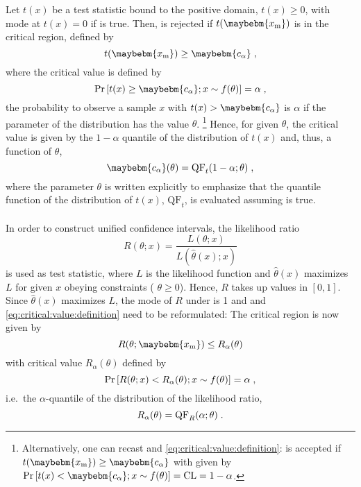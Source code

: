 \documentclass[a4paper]{article}
\newcommand*\Hnull{\maybebm{\mathrm{H}_0}\xspace}
\newcommand*\Prob{\mathrm{Pr}}
\newcommand*\xm{\maybebm{x_{\mathrm{m}}}\xspace}
\newcommand*\ta{\maybebm{c_\alpha}\xspace}
\newcommand*\QF{\mathrm{QF}}
\begin{document}
Let $t(x)$ be a test statistic bound to the positive domain, $t(x) \geq
0$, with mode at $t(x) = 0$ if \Hnull is true. Then, \Hnull is rejected
if $t(\xm)$ is in the critical region, defined by
%
\begin{equation}
  \label{eq:hnull:rejection}
  t(\xm) \geq \ta
  \fcomma
\end{equation}
%
where the critical value \ta is defined by
%
\begin{equation}
  \label{eq:critical:value:definition}
  \Prob\left[ t(x) \geq \ta; x \sim f(\theta)\right] = \alpha
  \fcomma
\end{equation}
%
\ie the probability to observe a sample $x$ with $t(x) > \ta$ is
$\alpha$ if the parameter of the distribution has the value $\theta$.%
\footnote{%
  Alternatively, one can recast  and
  \eqref{eq:critical:value:definition}: \Hnull is accepted if
  $t(\xm) \geq \ta$
  with \ta given by
  $\Pr\left[ t(x) < \ta; x \sim f(\theta) \right] = \CL = 1 - \alpha$.
}%
Hence, for given $\theta$, the critical value \ta is given by the
$1-\alpha$ quantile of the distribution of $t(x)$ and, thus, a function of
$\theta$,
%
\begin{equation*}
  \ta(\theta) = \QF_t(1-\alpha; \theta)
  \fcomma
\end{equation*}
%
where the parameter $\theta$ is written explicitly to emphasize that the
quantile function of the distribution of $t(x)$, $\QF_t$, is evaluated assuming \Hnull is true.

\paragraph{}
In order to construct unified confidence intervals, the likelihood ratio
%
\begin{equation*}
  R(\theta; x) = \frac{L(\theta; x)}{L(\hat{\theta}(x); x)}
\end{equation*}
is used as test statistic\cite{Feldman1998}, where $L$ is the likelihood function and
$\hat{\theta}(x)$ maximizes $L$ for given $x$ obeying constraints (\eg
$\theta \geq 0$).
Hence, $R$ takes up values in
$[0,1]$. Since $\hat{\theta}(x)$ maximizes $L$, the mode of $R$ under
\Hnull is 1 and  and
\eqref{eq:critical:value:definition} need to be reformulated: 
The critical region is now given by
%
\begin{equation}
  \label{eq:hnull:rejection:likelihood:ratio}
  R(\theta; \xm) \leq R_\alpha(\theta)
\end{equation}
%
with critical value $R_\alpha(\theta)$ defined by 
%
\begin{equation}
  \label{eq:critical:value:definition:likelihood:ratio}
  \Pr\left[ R(\theta; x) < R_\alpha(\theta); x \sim f(\theta)  \right] = \alpha
  \;,
\end{equation}
%
i.e.~the $\alpha$-quantile of the distribution of the likelihood ratio,
%
\begin{equation*}
  R_\alpha(\theta) = \QF_R(\alpha; \theta)
  \fstop
\end{equation*}
%
\end{document}
